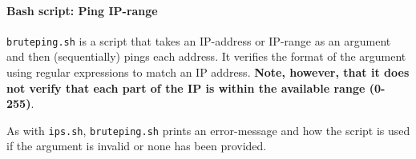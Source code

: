 \paragraph{Bash script: Ping IP-range}
\texttt{bruteping.sh} is a script that takes an IP-address or IP-range as an
argument and then (sequentially) pings each address. It verifies the format of the
argument using regular expressions to match an IP address. \textbf{Note, however,
that it does not verify that each part of the IP is within the available range (0-255)}.

As with \texttt{ips.sh}, \texttt{bruteping.sh} prints an error-message and how the script
is used if the argument is invalid or none has been provided.


